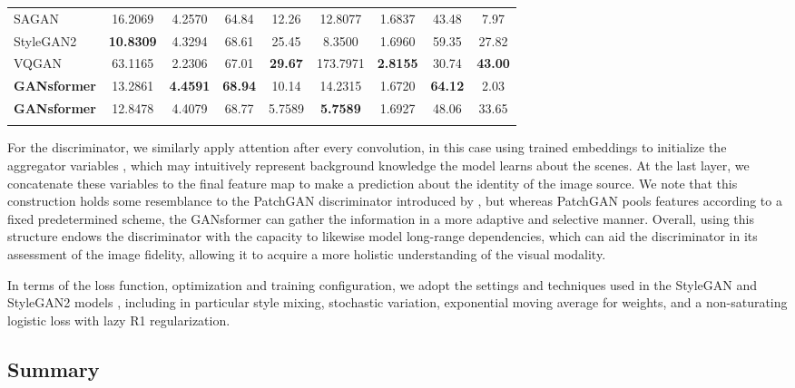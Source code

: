 \documentclass{article}
\begin{document}
\begin{table*}[ht]
\begin{tabular}{lcccccccc}
\scriptsize SAGAN & 16.2069 & 4.2570 & 64.84 & 12.26 & 12.8077 & 1.6837 & 43.48 & 7.97 \\
\scriptsize StyleGAN2 & \textbf{10.8309} & 4.3294 & 68.61 & 25.45 & 8.3500 & 1.6960 & 59.35 & 27.82 \\
\scriptsize VQGAN & 63.1165 & 2.2306 & 67.01 & \textbf{29.67} & 173.7971 & \textbf{2.8155} & 30.74 & \textbf{43.00} \\
\rowcolor{Blue2}
\scriptsize \textbf{GANsformer} & 13.2861 & \textbf{4.4591} & \textbf{68.94} & 10.14 & 14.2315 & 1.6720 & \textbf{64.12} & 2.03 \\
\rowcolor{Blue2}
\scriptsize \textbf{GANsformer} & 12.8478 & 4.4079 & 68.77 & 5.7589 & \textbf{5.7589} & 1.6927 & 48.06 & 33.65 \\
\rowcolor{Blue2}
\end{tabular}
\vspace*{-11pt}
\end{table*}

For the discriminator, we similarly apply attention after every convolution, in this case using trained embeddings to initialize the aggregator variables , which may intuitively represent background knowledge the model learns about the scenes. At the last layer, we concatenate these variables to the final feature map to make a prediction about the identity of the image source. We note that this construction holds some resemblance to the PatchGAN discriminator introduced by \citep{pix2pix}, but whereas PatchGAN pools features according to a fixed predetermined scheme, the GANsformer can gather the information in a more adaptive and selective manner. Overall, using this structure endows the discriminator with the capacity to likewise model long-range dependencies, which can aid the discriminator in its assessment of the image fidelity, allowing it to acquire a more holistic understanding of the visual modality.

In terms of the loss function, optimization and training configuration, we adopt the settings and techniques used in the StyleGAN and StyleGAN2 models \citep{stylegan,stylegan2}, including in particular style mixing, stochastic variation, exponential moving average for weights, and a non-saturating logistic loss with lazy R1 regularization. 

\subsection{Summary} \label{discussion}
\end{document}
